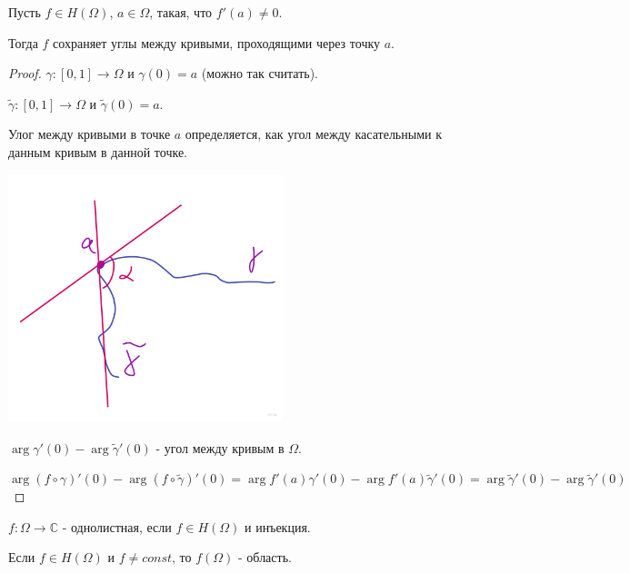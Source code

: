 \begin{theorem}
    Пусть $f \in H(\Omega)$, $a \in \Omega$, такая, что $f'(a) \neq 0$.

    Тогда $f$ сохраняет углы между кривыми, проходящими через точку $a$.
\end{theorem}

\begin{proof}
    $\gamma : [0, 1] \to \Omega$ и $\gamma (0) = a$ (можно так считать).

    $\tilde{\gamma} : [0, 1] \to \Omega$ и $\tilde{\gamma} (0) = a$.

    Улог между кривыми в точке $a$ определяется, как угол между касательными к данным кривым в данной точке.

    \begin{center}
        \includegraphics[width=8cm]{assets/04-functions-of-complex-variables/angle-between-curves.jpg}
    \end{center}

    $\arg \gamma'(0) - \arg \tilde{\gamma}'(0)$ - угол между кривым в $\Omega$.

    $\arg (f \circ \gamma)'(0) - \arg (f \circ \tilde{\gamma})'(0) = \arg f'(a)\gamma'(0) - \arg f'(a) \tilde{\gamma}'(0) =
    \arg \tilde{\gamma}'(0) - \arg \tilde{\gamma}'(0)$
\end{proof}

\begin{definition}
    $f : \Omega \to \mathbb{C}$ - однолистная, если $f \in H(\Omega)$ и
    инъекция.
\end{definition}

\begin{theorem}
    Если $f \in H(\Omega)$ и $f \neq const$, то $f(\Omega)$ - область.
\end{theorem}

